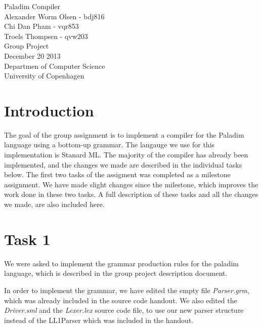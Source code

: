 \documentclass[12pt,a4paper,english]{article}
\begin{document}
\begin{titlepage}
    \vspace*{\fill}
    \begin{center}
      {\Huge Paladim Compiler}\\[0.7cm]
      {\large Alexander Worm Olsen - bdj816}\\[0.4cm]
      {\large Chi Dan Pham - vqr853}\\[0.4cm]
      {\large Troels Thompsen - qvw203}\\[0.4cm]
      {\small Group Project}\\[0.3cm]
      {\small December 20 2013}\\[0.3cm] 
      {\small Departmen of Computer Science}\\
      {\small University of Copenhagen}
    \end{center}
    \vspace*{\fill}
\end{titlepage}

\tableofcontents
\newpage
\section{Introduction}
The goal of the group assignment is to implement a compiler for the Paladim language using a bottom-up grammar. The langauge we use for this implementation is Stanard ML.
The majority of the compiler has already been implemented, and the changes we made are described in the individual tasks below. 
The first two tasks of the assigment was completed as a milestone assignment. We have made slight changes since the milestone, which improves the work done in these two tasks. A full description of these tasks and all the changes we made, are also included here.

\section{Task 1}
We were asked to implement the grammar production rules for the paladim language, which is described in the group project description document.

In order to implement the grammar, we have edited the empty file \textit{Parser.grm}, which was already included in the source code handout. We also edited the \textit{Driver.sml} and the \textit{Lexer.lex} source code file, to use our new parser structure instead of the LL1Parser which was included in the handout. \\
\end{document}
